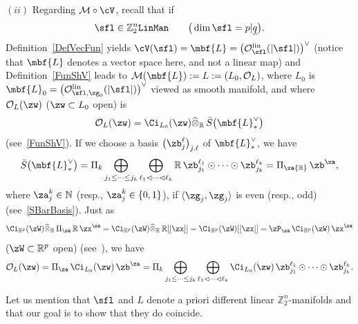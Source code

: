 \documentclass[pdftex]{sigma}%
\newcommand{\op}[1]{\operatorname{#1}}
\newcommand{\R}{{\mathbb R}}
\newcommand{\Z}{{\mathbb Z}}
\def\ul{\underline}
\def\la{\langle}
\def\cM{\cal M}
\def\cO{\mathcal{O}}
\def\cM{\mathcal{M}}
\def\ul{\underline}
\newcommand{\0}{\otimes}
\newcommand{\z}{\Z_2^n}
\numberwithin{equation}{section}
\begin{document}
$(ii)$ Regarding $\cM\circ\cV$, recall that if
\[
\sfl\in\z{\tt LinMan}\qquad \big(\op{dim}\sfl=p|\ul q\big).
\]
Definition~\eqref{DefVecFun} yields $\cV(\sfl)=\mbf{L}=\big(\cO_{\sfl}^{\op{lin}}(|\sfl|)\big)^\vee$ (notice that $\mbf{L}$ denotes a vector space here, and not a linear map) and Definition~\eqref{FunShV} leads to $\cM(\mbf{L}):=L:=(L_0,\cO_L)$, where $L_0$ is $\mbf{L}_0=\big(\cO_{\sfl,\zg_0}^{\op{lin}}(|\sfl|)\big)^\vee$ viewed as smooth manifold, and where $\cO_L(\zw)$ ($\zw\subset L_0$ open) is
\[
\cO_L(\zw)=\Ci_{L_0}(\zw)\widehat{\0}_\R\,\bar S\big(\mbf{L}_*^\vee\big)
\]
(see~\eqref{FunShV}). If we choose a basis $\big(\zb_j^\ell\big)_{j,\ell}$ of $\mbf{L}_*^\vee$, we have
\[
\bar S\big(\mbf{L}^\vee_*\big)=\Pi_k\bigoplus_{j_1\le\cdots\le j_k}\bigoplus_{\ell_1\lhd\cdots\lhd \ell_k}\R\,\zb_{j_1}^{\ell_1}\odot\cdots\odot \zb_{j_k}^{\ell_k}=\Pi_\za\R\,\zb^\za,
\]
where $\za_j^k\in\mathbb{N}$ (resp., $\za_j^k\in\{0,1\}$), if $\la\zg_j,\zg_j\rangle$ is even (resp., odd) (see~\eqref{SBarBasis}). Just as
\[
\Ci_{\R^p}(\zW)\widehat{\0}_\R\,\Pi_\za\,\R\,\zx^\za=\Ci_{\R^p}(\zW)\widehat{\0}_\R\,\R[[\zx]] =\Ci_{\R^p}(\zW)[[\zx]]=\zP_\za\,\Ci_{\R^p}(\zW)\,\zx^\za
\]
($\zW\subset\R^p$ open) (see~\cite{Bruce:2019}), we have
\begin{gather}\label{FctShVec}
\cO_L(\zw)=\Pi_\za\,\Ci_{L_0}(\zw)\,\zb^\za =\Pi_k\bigoplus_{j_1\le\cdots\le j_k}\bigoplus_{\ell_1\lhd\cdots\lhd \ell_k}\Ci_{L_0}(\zw)\,\zb_{j_1}^{\ell_1}\odot\cdots\odot \zb_{j_k}^{\ell_k} .
\end{gather}

\begin{Remark}
Let us mention that $\sfl$ and $L$ denote a priori different linear $\z$-manifolds and that our goal is to show that they do coincide.
\end{Remark}
\end{document}
